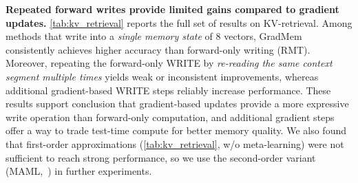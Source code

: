 \documentclass{article}
\theoremstyle{plain}
\theoremstyle{definition}
\theoremstyle{remark}
\begin{document}
{\textbf{Repeated forward writes provide limited gains compared to gradient updates.}
\cref{tab:kv_retrieval} reports the full set of results on KV-retrieval.
Among methods that write into a \emph{single memory state} of 8 vectors, GradMem consistently achieves higher accuracy than forward-only writing (RMT).
Moreover, repeating the forward-only WRITE by \emph{re-reading the same context segment multiple times} yields weak or inconsistent improvements, whereas additional gradient-based WRITE steps reliably increase performance.
These results support conclusion that gradient-based updates provide a more expressive write operation than forward-only computation, and additional gradient steps offer a way to trade test-time compute for better memory quality.
We also found that first-order approximations (\cref{tab:kv_retrieval}, w/o meta-learning) were not sufficient to reach strong performance, so we use the second-order variant (MAML,~\citet{maml}) in further experiments.


}
\end{document}
